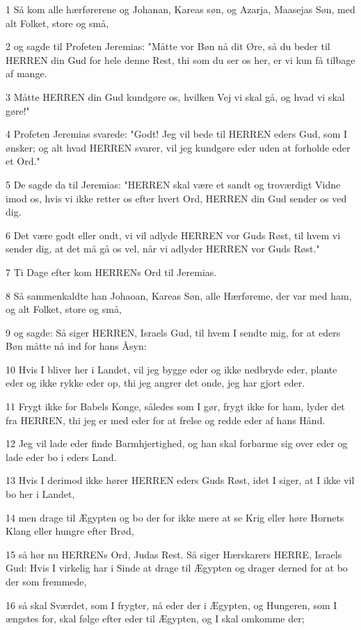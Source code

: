 \par 1 Så kom alle hærførerene og Johanan, Kareas søn, og Azarja, Maasejas Søn, med alt Folket, store og små,
\par 2 og sagde til Profeten Jeremias: "Måtte vor Bøn nå dit Øre, så du beder til HERREN din Gud for hele denne Rest, thi som du ser os her, er vi kun få tilbage af mange.
\par 3 Måtte HERREN din Gud kundgøre os, hvilken Vej vi skal gå, og hvad vi skal gøre!"
\par 4 Profeten Jeremias svarede: "Godt! Jeg vil bede til HERREN eders Gud, som I ønsker; og alt hvad HERREN svarer, vil jeg kundgøre eder uden at forholde eder et Ord."
\par 5 De sagde da til Jeremias: "HERREN skal være et sandt og troværdigt Vidne imod os, hvis vi ikke retter os efter hvert Ord, HERREN din Gud sender os ved dig.
\par 6 Det være godt eller ondt, vi vil adlyde HERREN vor Guds Røst, til hvem vi sender dig, at det må gå os vel, når vi adlyder HERREN vor Guds Røst."
\par 7 Ti Dage efter kom HERRENs Ord til Jeremias.
\par 8 Så sammenkaldte han Johaoan, Kareas Søn, alle Hærføreme, der var med ham, og alt Folket, store og små,
\par 9 og sagde: Så siger HERREN, Israels Gud, til hvem I sendte mig, for at eders Bøn måtte nå ind for hans Åsyn:
\par 10 Hvis I bliver her i Landet, vil jeg bygge eder og ikke nedbryde eder, plante eder og ikke rykke eder op, thi jeg angrer det onde, jeg har gjort eder.
\par 11 Frygt ikke for Babels Konge, således som I gør, frygt ikke for ham, lyder det fra HERREN, thi jeg er med eder for at frelse og redde eder af hans Hånd.
\par 12 Jeg vil lade eder finde Barmhjertighed, og han skal forbarme sig over eder og lade eder bo i eders Land.
\par 13 Hvis I derimod ikke hører HERREN eders Guds Røst, idet I siger, at I ikke vil bo her i Landet,
\par 14 men drage til Ægypten og bo der for ikke mere at se Krig eller høre Hornets Klang eller hungre efter Brød,
\par 15 så hør nu HERRENs Ord, Judas Rest. Så siger Hærskarers HERRE, Israels Gud: Hvis I virkelig har i Sinde at drage til Ægypten og drager derned for at bo der som fremmede,
\par 16 så skal Sværdet, som I frygter, nå eder der i Ægypten, og Hungeren, som I ængstes for, skal følge efter eder til Ægypten, og I skal omkomme der;
